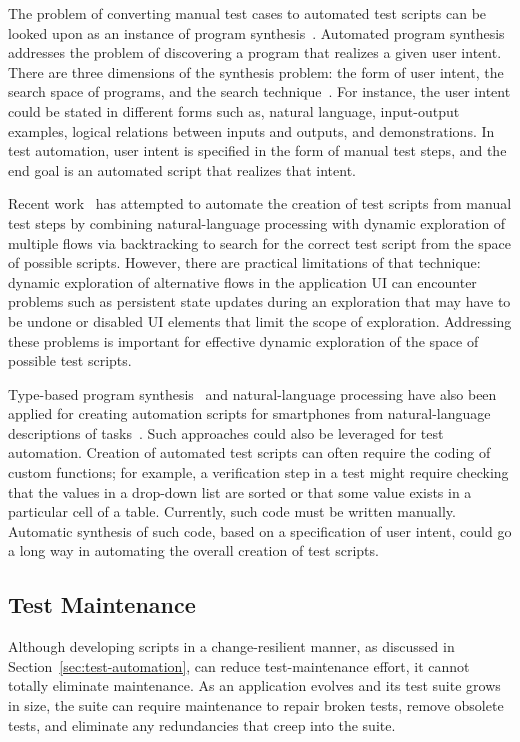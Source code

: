 The problem of converting manual test cases to automated test scripts can be
looked upon as an instance of program synthesis~\cite{Gulwani:2010}.  Automated
program synthesis addresses the problem of discovering a program that realizes a
given user intent. There are three dimensions of the synthesis problem: the form
of user intent, the search space of programs, and the search
technique~\cite{Gulwani:2010}. For instance, the user intent could be stated in
different forms such as, natural language, input-output examples, logical
relations between inputs and outputs, and demonstrations. In test automation,
user intent is specified in the form of manual test steps, and the end goal is
an automated script that realizes that intent.

Recent work~\cite{thummalapenta:2012a} has attempted to automate the creation of
test scripts from manual test steps by combining natural-language processing
with dynamic exploration of multiple flows via backtracking to search for the
correct test script from the space of possible scripts. However, there are
practical limitations of that technique: dynamic exploration of alternative
flows in the application UI can encounter problems such as persistent state
updates during an exploration that may have to be undone or disabled UI elements
that limit the scope of exploration. Addressing these problems is important for
effective dynamic exploration of the space of possible test scripts.

Type-based program synthesis~\cite{Perelman:2012} and natural-language
processing have also been applied for creating automation scripts for
smartphones from natural-language descriptions of tasks~\cite{Le:2013}. Such
approaches could also be leveraged for test automation. Creation of automated
test scripts can often require the coding of custom functions; for example, a
verification step in a test might require checking that the values in a
drop-down list are sorted or that some value exists in a particular cell of a
table. Currently, such code must be written manually. Automatic synthesis of
such code, based on a specification of user intent, could go a long way in
automating the overall creation of test scripts.

\subsection{Test Maintenance}
\label{sec:test-maintenance}

Although developing scripts in a change-resilient manner, as discussed in
Section~\ref{sec:test-automation}, can reduce test-maintenance effort, it cannot
totally eliminate maintenance. As an application evolves and its test suite
grows in size, the suite can require maintenance to repair broken tests, remove
obsolete tests, and eliminate any redundancies that creep into the suite.

